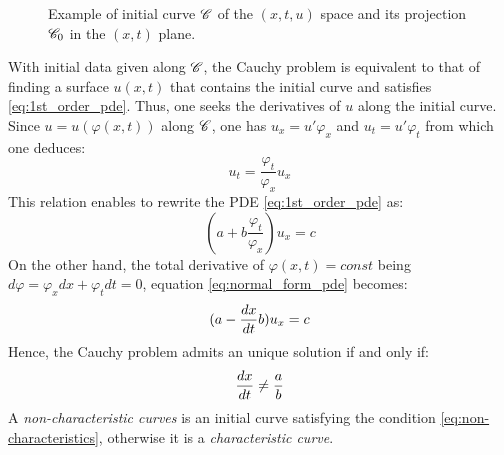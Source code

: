 \begin{figure}[h]
  \centering
  
  \caption{Example of initial curve $\mathscr{C}$ of the $(x,t,u)$ space and its projection $\mathscr{C}_0$ in the $(x,t)$ plane.}
  \label{fig:initial_curve}
\end{figure}
With initial data given along $\mathscr{C}$, the Cauchy problem is equivalent to that of finding a surface $u(x,t)$ that contains the initial curve and satisfies \eqref{eq:1st_order_pde}. Thus, one seeks the derivatives of $u$ along the initial curve. Since $u=u(\varphi(x,t))$ along $\mathscr{C}$, one has $u_x = u' \varphi_x $ and $u_t = u' \varphi_t$ from which one deduces:
\begin{equation*}
  u_t = \frac{\varphi_t}{\varphi_x}u_x 
\end{equation*}
This relation enables to rewrite the PDE \eqref{eq:1st_order_pde} as:
\begin{equation}
  \label{eq:normal_form_pde}
  (a + b\frac{\varphi_t}{\varphi_x})u_x = c
\end{equation}
On the other hand, the total derivative of $\varphi(x,t)=const$ being $d\varphi = \varphi_x dx + \varphi_t dt =0$, equation \eqref{eq:normal_form_pde} becomes:
\begin{equation}
  \label{eq:normal_form_pde_2}
  (a - \frac{d x}{d t}b)u_x = c
\end{equation}
Hence, the Cauchy problem admits an unique solution if and only if:
\begin{equation}
  \label{eq:non-characteristics}
  \frac{d x}{d t}\neq \frac{a}{b}
\end{equation}
A \textit{non-characteristic curves} is an initial curve satisfying the condition \eqref{eq:non-characteristics}, otherwise it is a \textit{characteristic curve}. 

